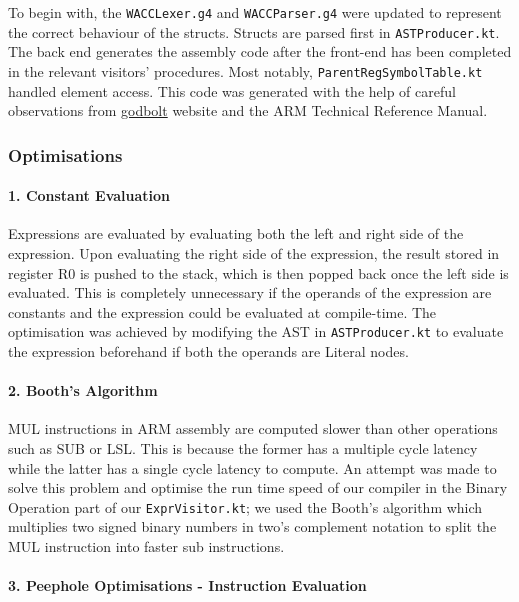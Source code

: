 \documentclass[a4paper,12pt]{article}
\newcommand{\shell}[1]{\lstinline!#1!}
\begin{document}
To begin with, the \shell{WACCLexer.g4} and \shell{WACCParser.g4} were updated to represent the correct behaviour of the structs. Structs are parsed first in \shell{ASTProducer.kt}. The back end generates the assembly code after the front-end has been completed in the relevant visitors' procedures. Most notably, \shell{ParentRegSymbolTable.kt} handled element access. This code was generated with the help of careful observations from  \hyperlink{ https://godbolt.org/ }{godbolt} website and the ARM Technical Reference Manual.

\subsubsection*{Optimisations}
\paragraph{1. Constant Evaluation} \mbox{}

Expressions are evaluated by evaluating both the left and right side of the expression. Upon evaluating the right side of the expression, the result stored in register R0 is pushed to the stack, which is then popped back once the left side is evaluated. This is completely unnecessary if the operands of the expression are constants and the expression could be evaluated at compile-time. The optimisation was achieved by modifying the AST in \shell{ASTProducer.kt} to evaluate the expression beforehand if both the operands are Literal nodes.

\paragraph{2. Booth's Algorithm} \mbox{}

MUL instructions in ARM assembly are computed slower than other operations such as SUB or LSL. This is because the former has a multiple cycle latency while the latter has a single cycle latency to compute. An attempt was made to solve this problem and optimise the run time speed of our compiler in the Binary Operation part of our \shell{ExprVisitor.kt}; we used the Booth's algorithm which multiplies two signed binary numbers in two's complement notation to split the MUL instruction into faster sub instructions.


\paragraph{3. Peephole Optimisations - Instruction Evaluation} \mbox{}
\end{document}
